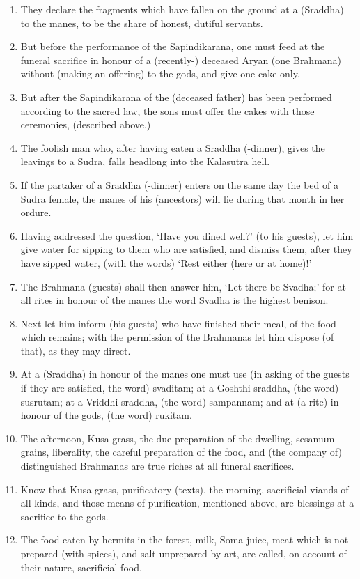 \begin{enumerate}
\item They declare the fragments which have fallen on the ground at a (Sraddha) to the manes, to be the share of honest, dutiful servants.
\item But before the performance of the Sapindikarana, one must feed at the funeral sacrifice in honour of a (recently-) deceased Aryan (one Brahmana) without (making an offering) to the gods, and give one cake only.
\item But after the Sapindikarana of the (deceased father) has been performed according to the sacred law, the sons must offer the cakes with those ceremonies, (described above.)
\item The foolish man who, after having eaten a Sraddha (-dinner), gives the leavings to a Sudra, falls headlong into the Kalasutra hell.
\item If the partaker of a Sraddha (-dinner) enters on the same day the bed of a Sudra female, the manes of his (ancestors) will lie during that month in her ordure.
\item Having addressed the question, `Have you dined well?' (to his guests), let him give water for sipping to them who are satisfied, and dismiss them, after they have sipped water, (with the words) `Rest either (here or at home)!'
\item The Brahmana (guests) shall then answer him, `Let there be Svadha;' for at all rites in honour of the manes the word Svadha is the highest benison.
\item Next let him inform (his guests) who have finished their meal, of the food which remains; with the permission of the Brahmanas let him dispose (of that), as they may direct.
\item At a (Sraddha) in honour of the manes one must use (in asking of the guests if they are satisfied, the word) svaditam; at a Goshthi-sraddha, (the word) susrutam; at a Vriddhi-sraddha, (the word) sampannam; and at (a rite) in honour of the gods, (the word) rukitam.
\item The afternoon, Kusa grass, the due preparation of the dwelling, sesamum grains, liberality, the careful preparation of the food, and (the company of) distinguished Brahmanas are true riches at all funeral sacrifices.
\item Know that Kusa grass, purificatory (texts), the morning, sacrificial viands of all kinds, and those means of purification, mentioned above, are blessings at a sacrifice to the gods.
\item The food eaten by hermits in the forest, milk, Soma-juice, meat which is not prepared (with spices), and salt unprepared by art, are called, on account of their nature, sacrificial food.

\end{enumerate}
